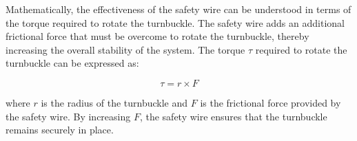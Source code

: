 Mathematically, the effectiveness of the safety wire can be understood in terms of the torque required to rotate the turnbuckle. The safety wire adds an additional frictional force that must be overcome to rotate the turnbuckle, thereby increasing the overall stability of the system. The torque $\tau$ required to rotate the turnbuckle can be expressed as:

\[
\tau = r \times F
\]

where $r$ is the radius of the turnbuckle and $F$ is the frictional force provided by the safety wire. By increasing $F$, the safety wire ensures that the turnbuckle remains securely in place.

